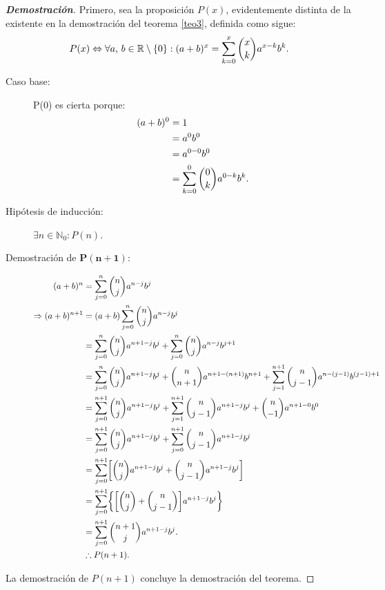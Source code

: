 \documentclass{article}
\theoremstyle{definition}
\begin{document}
\begin{proof}[\textbf{Demostración}]
Primero, sea la proposición $P(x)$, evidentemente distinta de la existente en la demostración del teorema \ref{teo3}, definida como sigue:
$$P(x) \Leftrightarrow \forall a \textnormal{, } b \in \mathbb{R}\setminus \{0\} :(a+b)^x= \displaystyle \sum_{k=0}^{x} \displaystyle \binom{x}{k} a^{x-k}b^{k}.$$
\begin{description}
\item[Caso base:] P(0) es cierta porque:
\begin{align*}
(a+b)^0 &= 1 \\
&= a^{0}b^{0} \\
&= a^{0-0}b^{0} \\
&= \displaystyle \sum_{k=0}^{0} \displaystyle \binom{0}{k} a^{0-k}b^{k}.\\
\end{align*}
\item[Hipótesis de inducción:] $\exists n \in \mathbb{N}_0 : P(n).$
\item[Demostración de $\mathbf{P(n+1)}$:]

\begin{align*}
(a+b)^{n} &= \sum_{j=0}^{n} \displaystyle \binom{n}{j} a^{n-j}b^{j} \\
\Rightarrow  (a+b)^{n+1} &= (a+b) \sum_{j=0}^{n} \displaystyle \binom{n}{j} a^{n-j}b^{j} \\
&= \sum_{j=0}^{n} \displaystyle \binom{n}{j} a^{n+1-j}b^{j} + \sum_{j=0}^{n} \displaystyle \binom{n}{j} a^{n-j}b^{j+1} \\
&= \sum_{j=0}^{n} \displaystyle \binom{n}{j} a^{n+1-j}b^{j} + \displaystyle \binom{n}{n+1} a^{n+1-(n+1)}b^{n+1} + \sum_{j=1}^{n+1} \displaystyle \binom{n}{j-1} a^{n-(j-1)}b^{(j-1)+1} \\
&= \sum_{j=0}^{n+1} \displaystyle \binom{n}{j} a^{n+1-j}b^{j} + \sum_{j=1}^{n+1} \displaystyle \binom{n}{j-1} a^{n+1-j}b^{j} + \displaystyle \binom{n}{-1} a^{n+1-0}b^{0} \\
&= \sum_{j=0}^{n+1} \displaystyle \binom{n}{j} a^{n+1-j}b^{j} + \sum_{j=0}^{n+1} \displaystyle \binom{n}{j-1} a^{n+1-j}b^{j} \\
&= \sum_{j=0}^{n+1} \biggl[ \displaystyle \binom{n}{j} a^{n+1-j}b^{j} + \displaystyle \binom{n}{j-1} a^{n+1-j}b^{j} \biggr] \\
&= \sum_{j=0}^{n+1} \biggl\{ \biggl[ \displaystyle \binom{n}{j} + \displaystyle \binom{n}{j-1} \biggr] a^{n+1-j}b^{j} \biggr\} \\
&= \sum_{j=0}^{n+1}  \displaystyle \binom{n+1}{j}  a^{n+1-j}b^{j}.\\
&\therefore P(n+1).
\end{align*}
\end{description}
La demostración de $P(n+1)$ concluye la demostración del teorema.
\end{proof}
\end{document}
